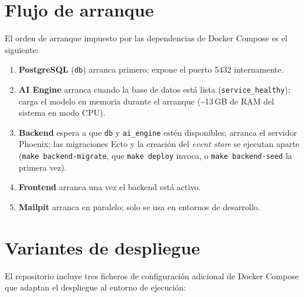 \section{Flujo de arranque}
\enlargethispage{2\baselineskip}

El orden de arranque impuesto por las dependencias de Docker Compose es el siguiente:

\begin{enumerate}
 \item \textbf{PostgreSQL} (\texttt{db}) arranca primero; expone el puerto 5432 internamente.
 \item \textbf{AI Engine} arranca cuando la base de datos está lista (\texttt{service\_healthy}); carga el modelo en memoria durante el arranque (\textasciitilde{}13\,GB de RAM del sistema en modo CPU).
 \item \textbf{Backend} espera a que \texttt{db} y \texttt{ai\_engine} estén disponibles; arranca el servidor Phoenix; las migraciones Ecto y la creación del \emph{event store} se ejecutan aparte (\texttt{make backend-migrate}, que \texttt{make deploy} invoca, o \texttt{make backend-seed} la primera vez).
 \item \textbf{Frontend} arranca una vez el backend está activo.
 \item \textbf{Mailpit} arranca en paralelo; solo se usa en entornos de desarrollo.
\end{enumerate}

\section{Variantes de despliegue}

El repositorio incluye tres ficheros de configuración adicional de Docker Compose que adaptan el despliegue al entorno de ejecución:

